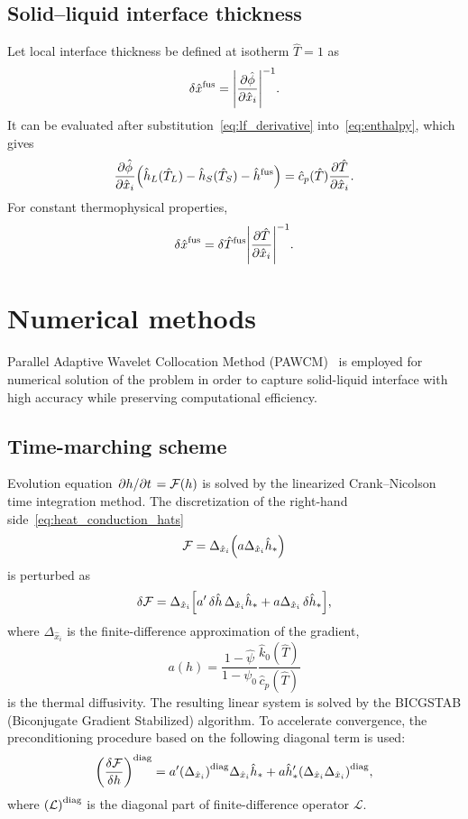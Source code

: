 \documentclass{article}
\newcommand{\dder}[2][]{\Delta_{#2}#1}
\newcommand{\diag}[1]{\qty(#1)^\mathrm{diag}}
\newcommand{\fusion}[1]{{#1}^\mathrm{fus}}
\newcommand{\Hx}{\hat{x}}
\newcommand{\Hh}{\hat{h}}
\newcommand{\HT}{\hat{T}}
\newcommand{\Hc}{\hat{c}}
\newcommand{\Hk}{\hat{k}}
\newcommand{\Hphi}{\hat{\phi}}
\newcommand{\Hpsi}{\hat{\psi}}
\begin{document}
\subsection{Solid--liquid interface thickness}

Let local interface thickness be defined at isotherm \(\HT=1\) as
\begin{equation}\label{eq:thickness}
    \delta\fusion{\Hx} = \qty|\pdv{\Hphi}{\Hx_i}|^{-1}.
\end{equation}
It can be evaluated after substitution~\eqref{eq:lf_derivative} into~\eqref{eq:enthalpy}, which gives
\begin{equation}\label{eq:phi_vs_temp}
    \pdv{\Hphi}{\Hx_i}\qty(\Hh_L(\HT_L)-\Hh_S(\HT_S)-\fusion{\Hh}) = \Hc_p(\HT)\pdv{\HT}{\Hx_i}.
\end{equation}
For constant thermophysical properties,
\begin{equation}\label{eq:thickness_simple}
    \fusion{\delta\Hx} = \delta\fusion{\HT}\qty|\pdv{\HT}{\Hx_i}|^{-1}.
\end{equation}

\section{Numerical methods}

Parallel Adaptive Wavelet Collocation Method (PAWCM)~\cite{Vasilyev2015} is employed for numerical solution of the problem
in order to capture solid-liquid interface with high accuracy while preserving computational efficiency.

\subsection{Time-marching scheme}

Evolution equation \(\pdv*{h}{t}=\mathcal{F}(h)\) is solved by the linearized Crank--Nicolson time integration method.
The discretization of the right-hand side~\eqref{eq:heat_conduction_hats}
\begin{equation}\label{eq:rhs}
    \mathcal{F} = \dder{\Hx_i}\qty(a \dder[\Hh_*]{\Hx_i})
\end{equation}
is perturbed as
\begin{equation}\label{eq:Drhs}
    \var{\mathcal{F}} = \dder{\Hx_i}\qty[ a'\var{\Hh}\dder[\Hh_*]{\Hx_i} + a\dder[\var{\Hh_*}]{\Hx_i} ],
\end{equation}
where \(\dder{\Hx_i}\) is the finite-difference approximation of the gradient,
\begin{equation}\label{eq:a}
    a(h) = \frac{1-\Hpsi}{1-\psi_0}\frac{\Hk_0(\HT)}{\Hc_p(\HT)}
\end{equation}
is the thermal diffusivity.
The resulting linear system is solved by the BICGSTAB (Biconjugate Gradient Stabilized) algorithm.
To accelerate convergence, the preconditioning procedure based on the following diagonal term is used:
\begin{equation}\label{eq:Drhs_diag}
    \diag{\fdv{\mathcal{F}}{h}} = a'\diag{\dder{\Hx_i}} \dder[\Hh_*]{\Hx_i} +
        a\Hh'_*\diag{\dder{\Hx_i}\dder{\Hx_i}},
\end{equation}
where \(\diag{\mathcal{L}}\) is the diagonal part of finite-difference operator \(\mathcal{L}\).
\end{document}
